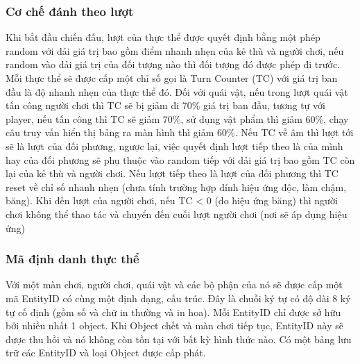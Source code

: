 \subsubsection{Cơ chế đánh theo lượt}
\hspace*{1cm} Khi bắt đầu chiến đấu, lượt của thực thể được quyết định bằng một phép random với dải giá trị bao gồm điểm nhanh nhẹn của kẻ thù và người chơi, nếu random vào dải giá trị của đối tượng nào thì đối tượng đó được phép đi trước. Mỗi thực thể sẽ được cấp một chỉ số gọi là Turn Counter (TC) với giá trị ban đầu là độ nhanh nhẹn của thực thể đó. Đối với quái vật, nếu trong lượt quái vật tấn công người chơi thì TC sẽ bị giảm đi 70\% giá trị ban đầu, tương tự với player, nếu tấn công thì TC sẽ giảm 70\%, sử dụng vật phẩm thì giảm 60\%, chạy câu truy vấn hiển thị bảng ra màn hình thì giảm 60\%. Nếu TC về âm thì lượt tới sẽ là lượt của đối phương, ngược lại, việc quyết định lượt tiếp theo là của mình hay của đối phương sẽ phụ thuộc vào random tiếp với dải giá trị bao gồm TC còn lại của kẻ thù và người chơi. Nếu lượt tiếp theo là lượt của đối phương thì TC reset về chỉ số nhanh nhẹn (chưa tính trường hợp dính hiệu ứng độc, làm chậm, băng). Khi đến lượt của người chơi, nếu TC < 0 (do hiệu ứng băng) thì người chơi không thể thao tác và chuyển đến cuối lượt người chơi (nơi sẽ áp dụng hiệu ứng)\\
\subsubsection{Mã định danh thực thể}
\hspace*{1cm} Với một màn chơi, người chơi, quái vật và các bộ phận của nó sẽ được cấp một mã EntityID có cùng một định dạng, cấu trúc. Đây là chuỗi ký tự có độ dài 8 ký tự cố định (gồm số và chữ in thường và in hoa). Mỗi EntityID chỉ được sở hữu bởi nhiều nhất 1 object. Khi Object chết và màn chơi tiếp tục, EntityID này sẽ được thu hồi và nó không còn tồn tại với bất kỳ hình thức nào. Có một bảng lưu trữ các EntityID và loại Object được cấp phát.
